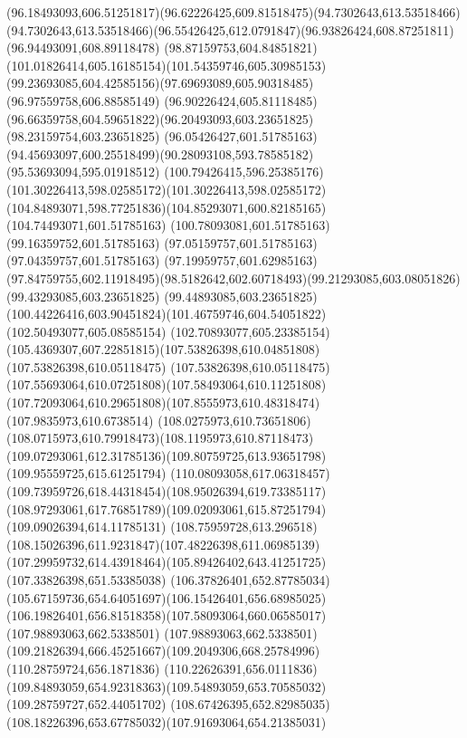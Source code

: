 {{		\curveto(96.18493093,606.51251817)(96.62226425,609.81518475)(94.7302643,613.53518466)
		\curveto(94.7302643,613.53518466)(96.55426425,612.0791847)(96.93826424,608.87251811)
		\lineto(96.94493091,608.89118478)
		\curveto(98.87159753,604.84851821)(101.01826414,605.16185154)(101.54359746,605.30985153)
		\curveto(99.23693085,604.42585156)(97.69693089,605.90318485)(96.97559758,606.88585149)
		\curveto(96.90226424,605.81118485)(96.66359758,604.59651822)(96.20493093,603.23651825)
		\lineto(98.23159754,603.23651825)
		\lineto(96.05426427,601.51785163)
		\curveto(94.45693097,600.25518499)(90.28093108,593.78585182)(95.53693094,595.01918512)
		\curveto(100.79426415,596.25385176)(101.30226413,598.02585172)(101.30226413,598.02585172)
		\curveto(104.84893071,598.77251836)(104.85293071,600.82185165)(104.74493071,601.51785163)
		\lineto(100.78093081,601.51785163)
		\lineto(99.16359752,601.51785163)
		\lineto(97.05159757,601.51785163)
		\lineto(97.04359757,601.51785163)
		\lineto(97.19959757,601.62985163)
		\curveto(97.84759755,602.11918495)(98.5182642,602.60718493)(99.21293085,603.08051826)
		\lineto(99.43293085,603.23651825)
		\lineto(99.44893085,603.23651825)
		\curveto(100.44226416,603.90451824)(101.46759746,604.54051822)(102.50493077,605.08585154)
		\curveto(102.70893077,605.23385154)(105.4369307,607.22851815)(107.53826398,610.04851808)
		\lineto(107.53826398,610.05118475)
		\curveto(107.53826398,610.05118475)(107.55693064,610.07251808)(107.58493064,610.11251808)
		\curveto(107.72093064,610.29651808)(107.8555973,610.48318474)(107.9835973,610.6738514)
		\curveto(108.0275973,610.73651806)(108.0715973,610.79918473)(108.1195973,610.87118473)
		\curveto(109.07293061,612.31785136)(109.80759725,613.93651798)(109.95559725,615.61251794)
		\curveto(110.08093058,617.06318457)(109.73959726,618.44318454)(108.95026394,619.73385117)
		\curveto(108.97293061,617.76851789)(109.02093061,615.87251794)(109.09026394,614.11785131)
		\curveto(108.75959728,613.296518)(108.15026396,611.9231847)(107.48226398,611.06985139)
		\curveto(107.29959732,614.43918464)(105.89426402,643.41251725)(107.33826398,651.53385038)
		\curveto(106.37826401,652.87785034)(105.67159736,654.64051697)(106.15426401,656.68985025)
		\curveto(106.19826401,656.81518358)(107.58093064,660.06585017)(107.98893063,662.5338501)
		\curveto(107.98893063,662.5338501)(109.21826394,666.45251667)(109.2049306,668.25784996)
		\lineto(110.28759724,656.1871836)
		\lineto(110.22626391,656.0111836)
		\curveto(109.84893059,654.92318363)(109.54893059,653.70585032)(109.28759727,652.44051702)
		\curveto(108.67426395,652.82985035)(108.18226396,653.67785032)(107.91693064,654.21385031)
}}
